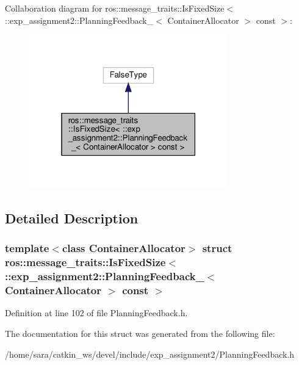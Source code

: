 Collaboration diagram for ros\+:\+:message\+\_\+traits\+:\+:Is\+Fixed\+Size$<$ \+:\+:exp\+\_\+assignment2\+:\+:Planning\+Feedback\+\_\+$<$ Container\+Allocator $>$ const $>$\+:
\nopagebreak
\begin{figure}[H]
\begin{center}
\leavevmode
\includegraphics[width=244pt]{structros_1_1message__traits_1_1IsFixedSize_3_01_1_1exp__assignment2_1_1PlanningFeedback___3_01Cc7497ad08d4bb56b093d5347ccfd2575}
\end{center}
\end{figure}


\subsection{Detailed Description}
\subsubsection*{template$<$class Container\+Allocator$>$\newline
struct ros\+::message\+\_\+traits\+::\+Is\+Fixed\+Size$<$ \+::exp\+\_\+assignment2\+::\+Planning\+Feedback\+\_\+$<$ Container\+Allocator $>$ const $>$}



Definition at line 102 of file Planning\+Feedback.\+h.



The documentation for this struct was generated from the following file\+:\begin{DoxyCompactItemize}
\item 
/home/sara/catkin\+\_\+ws/devel/include/exp\+\_\+assignment2/Planning\+Feedback.\+h\end{DoxyCompactItemize}
